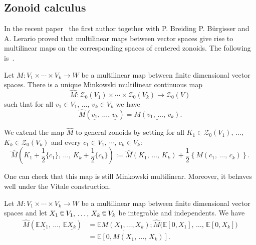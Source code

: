 \documentclass[10pt]{amsart}
\theoremstyle{definition}\newtheorem{defi}[theo]{Definition}\newtheorem{rema}[theo]{Remark}\newtheorem{exam}[theo]{Example}\newtheorem{exem}[theo]{Example}\newtheorem{nota}[theo]{Notation}
\newcommand{\EE}{\mathbb{E}}
\newcommand{\ZZo}{\mathscr{Z}_0}
\newcommand{\seg}{\underline}
\newcommand*\randin{
\mathchoice {\raisebox{-.35ex}{$\displaystyle{^\subset}$}\mkern-11.5mu\raisebox{+.45ex}{$\displaystyle{_\subset}$}} {\mkern+1mu\raisebox{-.27ex}{$\textstyle{^\subset}$}\mkern-11.7mu\raisebox{+.45ex}{$\textstyle{_\subset}$}} {\raisebox{.35ex}{$\scriptstyle\subset$}\mkern-14mu\raisebox{-.15ex}{$\scriptstyle\subset$}} {\raisebox{.3ex}{$\scriptscriptstyle\subset$}\mkern-13.5mu\raisebox{-.10ex}{$\scriptscriptstyle\subset$}}}
\begin{document}
\subsection{Zonoid calculus}\label{sub:zonoidcalc}


In the recent paper~\cite{ZA} the first author together with P. Breiding P. B\"urgisser and A. Lerario proved that multilinear maps between vector spaces give rise to multilinear maps on the corresponding spaces of centered zonoids. The following is~\cite[Theorem~4.1]{ZA}.

\begin{prop}\label{thm:FTZC}
Let $M:V_1\times\cdots\times V_k\to W$ be a multilinear map between finite dimensional vector spaces. There is a unique Minkowski multilinear continuous map
\begin{equation*}
\widehat{M}:\ZZo(V_1)\times\cdots\times\ZZo(V_k)\to \ZZo(V)
\end{equation*}
such that for all $v_1\in V_1,\,\ldots,\,v_k\in V_k$ we have
\begin{equation*}
\widehat{M}\left(\seg{v_1},\,\ldots,\,\seg{v_k}\right)=\seg{M(v_1,\,\ldots,\,v_k)}.
\end{equation*}
\end{prop}

We extend the map $\widehat{M}$ to general zonoids by setting for all $K_1\in\ZZo(V_1)$, $\ldots$, $K_k\in\ZZo(V_k)$ and every $c_1\in V_1,\,\cdots,\, c_k\in V_k$:
\begin{equation}\label{eq:Mnotcent}
\widehat{M}\left(K_1+\frac{1}{2}\{c_1\},\,\ldots,\,K_k+\frac{1}{2}\{c_k\}\right):=\widehat{M}\left(K_1,\,\ldots,\,K_k\right)+\frac{1}{2}\left\{M(c_1,\,\ldots,\,c_k)\right\}.
\end{equation}

One can check that this map is still Minkowski multilinear. Moreover, it behaves well under the Vitale construction.

\begin{prop}\label{prop:multandVit}
Let $M:V_1\times\cdots\times V_k\to W$ be a multilinear map between finite dimensional vector spaces and let $X_1\,\randin\, V_1,\,\ldots,\,X_k\,\randin\, V_k$ be integrable and independents. We have
\begin{align*}
\widehat{M}\left(\EE\seg{X_1},\,\ldots,\,\EE\seg{X_k}\right)&=\seg{\EE M(X_1,\ldots,X_k)}; \widehat{M}\big(\EE[0,X_1],\,\ldots,\,\EE[0,X_k]\big)\\
&=\EE[0,M(X_1,\,\ldots,\,X_k)].
\end{align*}
\end{prop}
\end{document}
